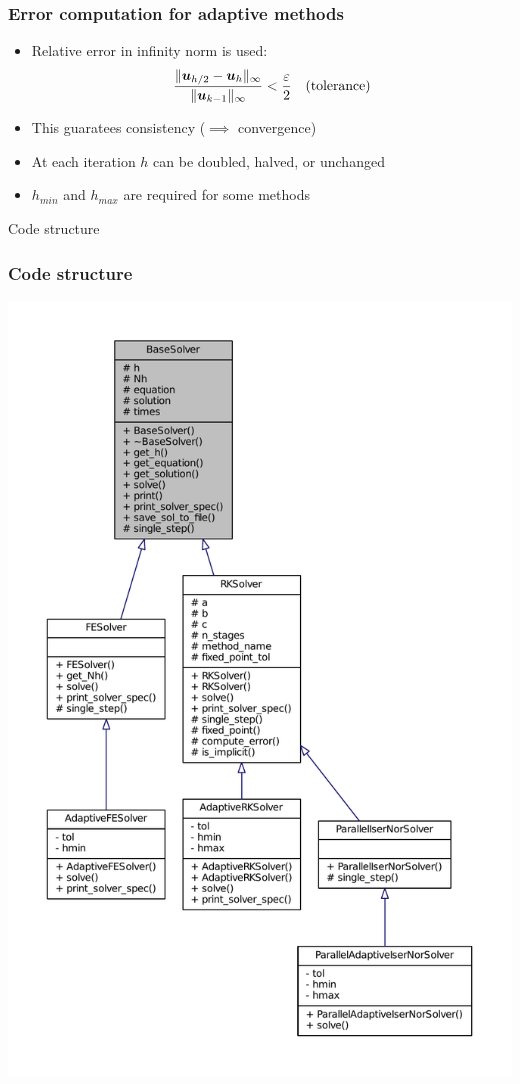 \documentclass{beamer}
\begin{document}
\begin{frame} %
	\frametitle{Error computation for adaptive methods}
	\begin{itemize}
		\item Relative error in infinity norm is used:
		$$\frac{\lVert\boldsymbol u_{h/2}-\boldsymbol u_h\rVert_\infty}{\lVert\boldsymbol u_{k-1}\rVert_\infty} <
		\frac{\varepsilon}{2} \quad \text{(tolerance)}$$
		\item This guaratees consistency ($\implies$ convergence)
		\item At each iteration $h$ can be doubled, halved, or unchanged
		\item $h_{min}$ and $h_{max}$ are required for some methods
	\end{itemize}
\end{frame}


\begin{frame}[c] %
\begin{center}
	\Huge \color{blue} Code structure
\end{center}
\end{frame}


\begin{frame} %
	\frametitle{Code structure}
	\begin{center}
		\includegraphics[width=0.45 \linewidth]{etc/classes_full.pdf}
	\end{center}
\end{frame}
\end{document}
